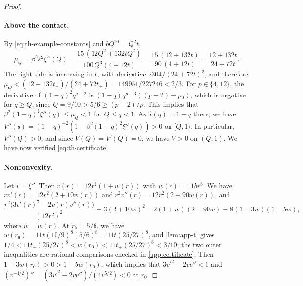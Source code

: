 \begin{proof}
\paragraph{Above the contact.}
By \eqref{eq:th-example-constants} and $bQ^{10}=Q^2t$,
\[
\mu_Q=\beta^2s^2\xi''(Q)=\frac{15\,(12Q^2+132tQ^2)}{100\,Q^3(4+12t)}=\frac{15\,(12+132t)}{90\,(4+12t)}=\frac{12+132t}{24+72t}.
\]
The right side is increasing in $t$, with derivative $2304/(24+72t)^2$, and therefore $\mu_Q<(12+132t_+)/(24+72t_+)=149951/227246<2/3$. For $p\in\{4,12\}$, the derivative of $(1-q)^2q^{p-2}$ is $(1-q)q^{p-3}((p-2)-pq)$, which is negative for $q\ge Q$, since $Q=9/10>5/6\ge(p-2)/p$. This implies that $\beta^2(1-q)^2\xi''(q)\le\mu_Q<1$ for $Q\le q<1$. As $\hat x(q)=1-q$ there, we have $V''(q)=(1-q)^{-2}(1-\beta^2(1-q)^2\xi''(q))>0$ on $[Q,1)$. In particular, $V''(Q)>0$, and since $V(Q)=V'(Q)=0$, we have $V>0$ on $(Q,1)$. We have now verified \eqref{eq:th-certificate}.

\paragraph{Nonconvexity.}
Let $v=\xi''$. Then $v(r)=12r^2(1+w(r))$ with $w(r)=11br^8$. We have $rv'(r)=12r^2(2+10w(r))$ and $r^2v''(r)=12r^2(2+90w(r))$, and
\[
\frac{r^2\big(3v'(r)^2-2v(r)v''(r)\big)}{(12r^2)^2}=3(2+10w)^2-2(1+w)(2+90w)=8(1-3w)(1-5w),
\]
where $w=w(r)$. At $r_0=5/6$, we have $w(r_0)=11t(10/9)^8(5/6)^8=11t(25/27)^8$, and \cref{lem:app-t} gives $1/4<11t_-(25/27)^8<w(r_0)<11t_+(25/27)^8<3/10$; the two outer inequalities are rational comparisons checked in \cref{app:certificate}. Then $1-3w(r_0)>0>1-5w(r_0)$, which implies that $3v'^2-2vv''<0$ and $(v^{-1/2})''=(3v'^2-2vv'')/(4v^{5/2})<0$ at $r_0$.
\end{proof}
